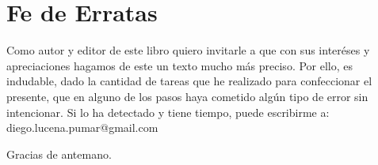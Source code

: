 \chapter{Fe de Erratas}
Como autor y editor de este libro quiero invitarle a que con sus inter\'eses y
apreciaciones hagamos de este un texto mucho m\'as preciso. Por ello, es
indudable, dado la cantidad de tareas que he realizado para confeccionar el
presente, que en alguno de los pasos haya cometido alg\'un tipo de error sin
intencionar. Si lo ha detectado y tiene tiempo, puede escribirme a: diego.lucena.pumar@gmail.com 


Gracias de antemano.